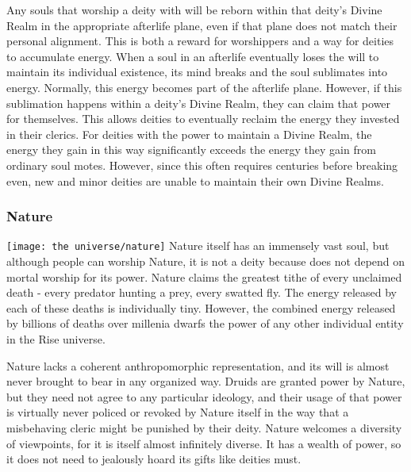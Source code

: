             Any souls that worship a deity with will be reborn within that deity's Divine Realm in the appropriate afterlife plane, even if that plane does not match their personal alignment.
            This is both a reward for worshippers and a way for deities to accumulate energy.
            When a soul in an afterlife eventually loses the will to maintain its individual existence, its mind breaks and the soul sublimates into energy.
            Normally, this energy becomes part of the afterlife plane.
            However, if this sublimation happens within a deity's Divine Realm, they can claim that power for themselves.
            This allows deities to eventually reclaim the energy they invested in their clerics.
            For deities with the power to maintain a Divine Realm, the energy they gain in this way significantly exceeds the energy they gain from ordinary soul motes.
            However, since this often requires centuries before breaking even, new and minor deities are unable to maintain their own Divine Realms.

        \subsubsection{Nature}
            \texttt{[image: the universe/nature]}
            Nature itself has an immensely vast soul, but although people can worship Nature, it is not a deity because does not depend on mortal worship for its power.
            Nature claims the greatest tithe of every unclaimed death - every predator hunting a prey, every swatted fly.
            The energy released by each of these deaths is individually tiny.
            However, the combined energy released by billions of deaths over millenia dwarfs the power of any other individual entity in the Rise universe.

            Nature lacks a coherent anthropomorphic representation, and its will is almost never brought to bear in any organized way.
            Druids are granted power by Nature, but they need not agree to any particular ideology, and their usage of that power is virtually never policed or revoked by Nature itself in the way that a misbehaving cleric might be punished by their deity.
            Nature welcomes a diversity of viewpoints, for it is itself almost infinitely diverse.
            It has a wealth of power, so it does not need to jealously hoard its gifts like deities must.

